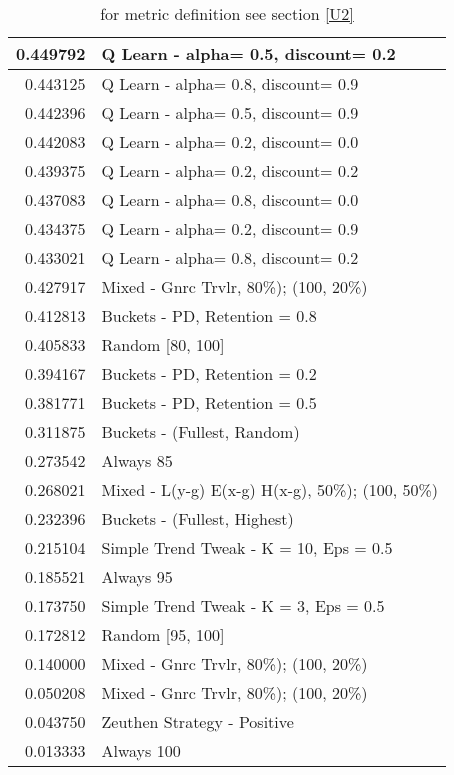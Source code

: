 \begin{table}[!hbtp]
\begin{footnotesize}
\begin{tabular}{|r|l|}
0.449792 & Q Learn - alpha= 0.5, discount= 0.2\\ \hline
0.443125 & Q Learn - alpha= 0.8, discount= 0.9\\ \hline
0.442396 & Q Learn - alpha= 0.5, discount= 0.9\\ \hline
0.442083 & Q Learn - alpha= 0.2, discount= 0.0\\ \hline
0.439375 & Q Learn - alpha= 0.2, discount= 0.2\\ \hline
0.437083 & Q Learn - alpha= 0.8, discount= 0.0\\ \hline
0.434375 & Q Learn - alpha= 0.2, discount= 0.9\\ \hline
0.433021 & Q Learn - alpha= 0.8, discount= 0.2\\ \hline
0.427917 & Mixed - {Gnrc Trvlr, 80\%); (100, 20\%)}\\ \hline
0.412813 & Buckets - PD, Retention = 0.8\\ \hline
0.405833 & Random [80, 100]\\ \hline
0.394167 & Buckets - PD, Retention = 0.2\\ \hline
0.381771 & Buckets - PD, Retention = 0.5\\ \hline
0.311875 & Buckets - (Fullest, Random)\\ \hline
0.273542 & Always 85\\ \hline
0.268021 & Mixed - {L(y-g) E(x-g) H(x-g), 50\%); (100, 50\%)}\\ \hline
0.232396 & Buckets - (Fullest, Highest)\\ \hline
0.215104 & Simple Trend Tweak - K = 10, Eps = 0.5\\ \hline
0.185521 & Always 95\\ \hline
0.173750 & Simple Trend Tweak - K = 3, Eps = 0.5\\ \hline
0.172812 & Random [95, 100]\\ \hline
0.140000 & Mixed - {Gnrc Trvlr, 80\%); (100, 20\%)}\\ \hline
0.050208 & Mixed - {Gnrc Trvlr, 80\%); (100, 20\%)}\\ \hline
0.043750 & Zeuthen Strategy - Positive\\ \hline
0.013333 & Always 100\\ \hline
\end{tabular}
\caption{for metric definition see section \eqref{U2}}
\end{footnotesize}
\end{table}

